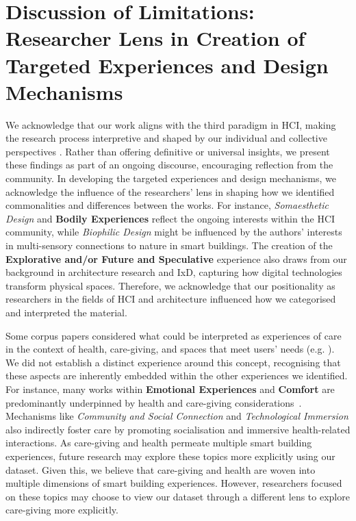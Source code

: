 \section{Discussion of Limitations: Researcher Lens in Creation of Targeted Experiences and Design Mechanisms}
We acknowledge that our work aligns with the third paradigm in HCI, making the research process interpretive and shaped by our individual and collective perspectives \cite{harrison2011making}. Rather than offering definitive or universal insights, we present these findings as part of an ongoing discourse, encouraging reflection from the community. In developing the targeted experiences and design mechanisms, we acknowledge the influence of the researchers' lens in shaping how we identified commonalities and differences between the works. For instance, \textit{Somaesthetic Design} and \textbf{Bodily Experiences} reflect the ongoing interests within the HCI community, while \textit{Biophilic Design} might be influenced by the authors' interests in multi-sensory connections to nature in smart buildings. The creation of the \textbf{Explorative and/or Future and Speculative} experience also draws from our background in architecture research and IxD, capturing how digital technologies transform physical spaces. Therefore, we acknowledge that our positionality as researchers in the fields of HCI and architecture influenced how we categorised and interpreted the material.

Some corpus papers considered what could be interpreted as experiences of care in the context of health, care-giving, and spaces that meet users' needs (e.g. \cite{hosseini2023integrating, sowles2021introducing}). We did not establish a distinct experience around this concept, recognising that these aspects are inherently embedded within the other experiences we identified. For instance, many works within \textbf{Emotional Experiences} and \textbf{Comfort} are predominantly underpinned by health and care-giving considerations~\cite{alavi2017comfort, zhong2020hilo}. Mechanisms like \textit{Community and Social Connection} and \textit{Technological Immersion} also indirectly foster care by promoting socialisation and immersive health-related interactions. As care-giving and health permeate multiple smart building experiences, future research may explore these topics more explicitly using our dataset. Given this, we believe that care-giving and health are woven into multiple dimensions of smart building experiences. However, researchers focused on these topics may choose to view our dataset through a different lens to explore care-giving more explicitly.

